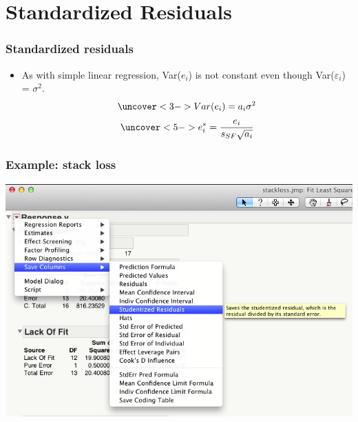\documentclass[handout]{beamer}\usepackage{graphicx, color}
\providecommand{\e}{\varepsilon}
\numberwithin{equation}{section}
\begin{document}
\section{Standardized Residuals}

\begin{frame}
\frametitle{Standardized residuals}
\begin{itemize}
\item As with simple linear regression, Var($e_i$) is not constant even though Var($\e_i$) = $\sigma^2$. 
\begin{align*}
\uncover<3->{Var(e_i) = a_i \sigma^2}
\end{align*}
\begin{align*}
\uncover<5->{e_i^* = \frac{e_i}{s_{SF} \sqrt{a_i}}}
\end{align*}
\end{itemize}
\end{frame}

\begin{frame}
\frametitle{Example: stack loss}
 \includegraphics{../../fig/stackstd1.png}
\end{frame}
\end{document}
